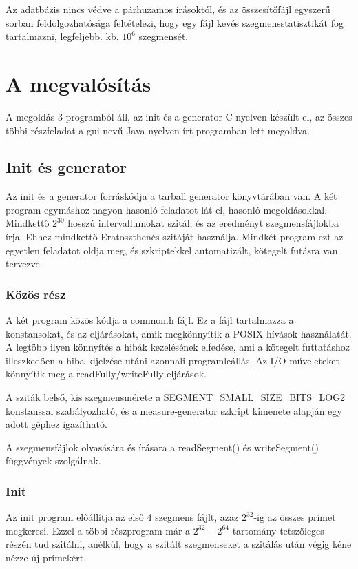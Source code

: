 Az adatbázis nincs védve a párhuzamos írásoktól, és az összesítőfájl egyszerű sorban feldolgozhatósága feltételezi, hogy egy fájl kevés szegmensstatisztikát fog tartalmazni, legfeljebb. kb. $10^6$ szegmensét.

\section{A megvalósítás}

A megoldás 3 programból áll, az init és a generator C nyelven készült el, az összes többi részfeladat a gui nevű Java nyelven írt programban lett megoldva.

\subsection{Init és generator}

Az init és a generator forráskódja a tarball generator könyvtárában van.
A két program egymáshoz nagyon hasonló feladatot lát el, hasonló megoldásokkal.
Mindkettő $2^{30}$ hosszú intervallumokat szitál, és az eredményt szegmensfájlokba írja.
Ehhez mindkettő Eratoszthenés szitáját használja.
Mindkét program ezt az egyetlen feladatot oldja meg, és szkriptekkel automatizált, kötegelt futásra van tervezve.

\subsubsection{Közös rész}

A két program közös kódja a common.h fájl.
Ez a fájl tartalmazza a konstansokat, és az eljárásokat, amik megkönnyítik a POSIX hívások használatát.
A legtöbb ilyen könnyítés a hibák kezelésének elfedése, ami a kötegelt futtatáshoz illeszkedően
a hiba kijelzése utáni azonnali programleállás.
Az I/O műveleteket könnyítik meg a readFully/writeFully
eljárások.

A sziták belső, kis szegmensmérete a
SEGMENT\_SMALL\_SIZE\_BITS\_LOG2 konstanssal
szabályozható, és a measure-generator szkript
kimenete alapján egy adott géphez igazítható.

A szegmensfájlok olvasására és írásara a readSegment() és writeSegment() függvények szolgálnak.

\subsubsection{Init}

Az init program előállítja az első 4 szegmens fájlt, azaz $2^{32}$-ig az összes prímet megkeresi.
Ezzel a többi részprogram már a $2^{32} - 2^{64}$ tartomány tetszőleges részén tud szitálni, anélkül, hogy a szitált szegmenseket a szitálás után végig kéne nézze új prímekért.

